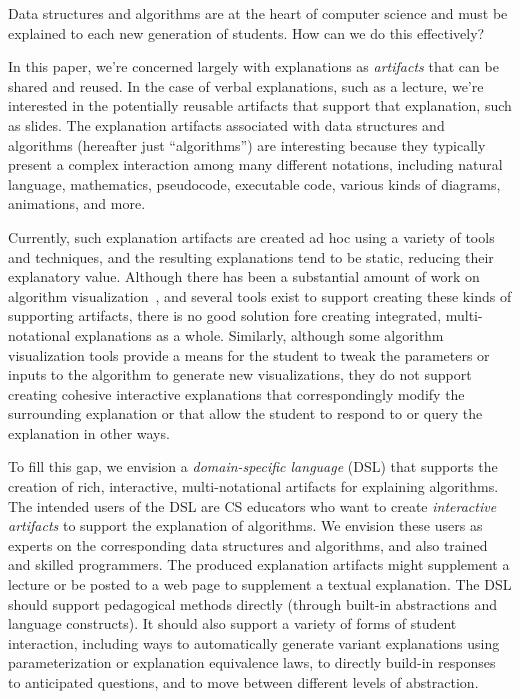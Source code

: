 \documentclass[conference]{IEEEtran}
\begin{document}
Data structures and algorithms are at the heart of computer science and must be
explained to each new generation of students. How can we do this effectively?


In this paper, we're concerned largely with explanations as \emph{artifacts}
that can be shared and reused. In the case of verbal explanations, such as a
lecture, we're interested in the potentially reusable artifacts that support
that explanation, such as slides.
%
The explanation artifacts associated with data structures and algorithms
(hereafter just ``algorithms'') are interesting because they typically present
a complex interaction among many different notations, including natural
language, mathematics, pseudocode, executable code, various kinds of diagrams,
animations, and more.


Currently, such explanation artifacts are created ad hoc using a variety of
tools and techniques, and the resulting explanations tend to be static,
reducing their explanatory value.
%
Although there has been a substantial amount of work on algorithm
visualization~\cite{Gloor92,Gloor97,HDS02,?}, and several tools exist to
support creating these kinds of supporting artifacts, there is no good solution
fore creating integrated, multi-notational explanations as a whole. Similarly,
although some algorithm visualization tools provide a means for the student to
tweak the parameters or inputs to the algorithm to generate new visualizations,
they do not support creating cohesive interactive explanations that
correspondingly modify the surrounding explanation or that allow the student to
respond to or query the explanation in other ways.


To fill this gap, we envision a \emph{domain-specific language} (DSL) that
supports the creation of rich, interactive, multi-notational artifacts for
explaining algorithms. 
%
The intended users of the DSL are CS educators who want to create
\emph{interactive artifacts} to support the explanation of algorithms. We
envision these users as experts on the corresponding data structures and
algorithms, and also trained and skilled programmers. The produced explanation
artifacts might supplement a lecture or be posted to a web page to supplement a
textual explanation.
%
The DSL should support pedagogical methods directly (through built-in
abstractions and language constructs). It should also support a variety of
forms of student interaction, including ways to automatically generate variant
explanations using parameterization or explanation equivalence laws, to
directly build-in responses to anticipated questions, and to move between
different levels of abstraction.
\end{document}
